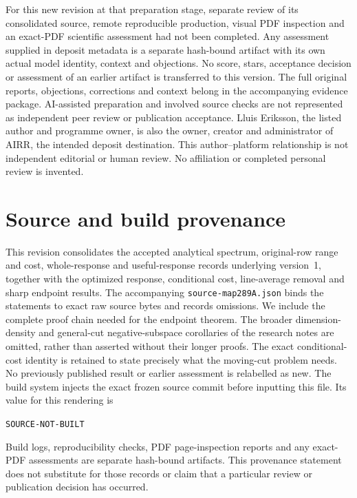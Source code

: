 \documentclass[11pt]{article}
\providecommand{\SourceCommit}{SOURCE-NOT-BUILT}
\theoremstyle{definition}
\theoremstyle{remark}
\begin{document}
For this new revision at that preparation stage, separate review of its consolidated source,
remote reproducible production, visual PDF inspection and an exact-PDF
scientific assessment had not been completed. Any assessment supplied in
deposit metadata is a separate hash-bound artifact with its own actual
model identity, context and objections. No score, stars, acceptance
decision or assessment of an earlier artifact is transferred to this
version. The full original reports, objections, corrections and context
belong in the accompanying evidence package. AI-assisted preparation and
involved source checks are not represented as independent peer review or
publication acceptance. Lluis Eriksson, the listed author and programme
owner, is also the owner, creator and administrator of AIRR, the intended
deposit destination. This author--platform relationship is not independent
editorial or human review. No affiliation or completed personal review is
invented.

\appendix
\section{Source and build provenance}\label{app:provenance}
This revision consolidates the accepted analytical spectrum, original-row
range and cost, whole-response and useful-response records underlying
version~1, together with the optimized response, conditional cost,
line-average removal and sharp endpoint results. The accompanying
\texttt{source-map289A.json} binds the statements to exact raw source
bytes and records omissions. We include the complete proof chain needed
for the endpoint theorem. The broader dimension-density and general-cut
negative-subspace corollaries of the research notes are omitted, rather
than asserted without their longer proofs. The exact conditional-cost
identity is retained to state precisely what the moving-cut problem needs.
No previously published result or earlier assessment is relabelled as new.
The build system injects the exact frozen source commit before inputting
this file. Its value for this rendering is
\begin{center}\texttt{\SourceCommit}\end{center}
Build logs, reproducibility checks, PDF page-inspection reports and any
exact-PDF assessments are separate hash-bound artifacts. This provenance
statement does not substitute for those records or claim that a particular
review or publication decision has occurred.
\end{document}
